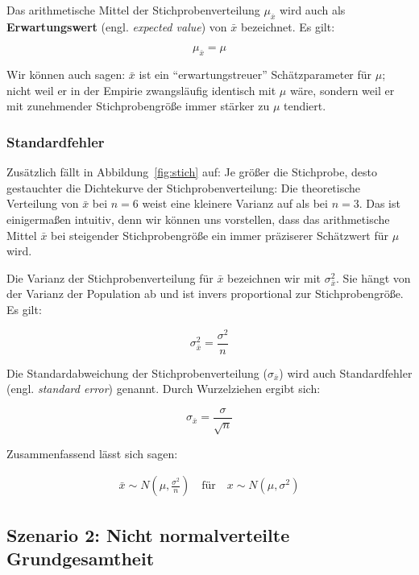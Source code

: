 \documentclass[
  11pt,
  ngerman,
  a4paper,
]{report}
\begin{document}
Das arithmetische Mittel der Stichprobenverteilung \(\mu_{\bar{x}}\) wird auch als \textbf{Erwartungswert} (engl. \emph{expected value}) von \(\bar{x}\) bezeichnet. Es gilt:

\nopagebreak

\[
\mu_{\bar{x}} = \mu
\label{eq:mean}
\]

Wir können auch sagen: \(\bar{x}\) ist ein \enquote{erwartungstreuer} Schätzparameter für \(\mu\); nicht weil er in der Empirie zwangsläufig identisch mit \(\mu\) wäre, sondern weil er mit zunehmender Stichprobengröße immer stärker zu \(\mu\) tendiert.

\hypertarget{standardfehler}{%
\subsubsection{Standardfehler}\label{standardfehler}}

Zusätzlich fällt in Abbildung~\ref{fig:stich} auf: Je größer die Stichprobe, desto gestauchter die Dichtekurve der Stichprobenverteilung: Die theoretische Verteilung von \(\bar{x}\) bei \(n=6\) weist eine kleinere Varianz auf als bei \(n=3\). Das ist einigermaßen intuitiv, denn wir können uns vorstellen, dass das arithmetische Mittel \(\bar{x}\) bei steigender Stichprobengröße ein immer präziserer Schätzwert für \(\mu\) wird.

Die Varianz der Stichprobenverteilung für \(\bar{x}\) bezeichnen wir mit \(\sigma^2_{\bar{x}}\). Sie hängt von der Varianz der Population ab und ist invers proportional zur Stichprobengröße. Es gilt:

\nopagebreak

\[
\sigma^2_{\bar{x}} = \frac{\sigma^2}{n}
\label{eq:4var}
\]

Die Standardabweichung der Stichprobenverteilung (\(\sigma_{\bar{x}}\)) wird auch Standardfehler (engl. \emph{standard error}) genannt. Durch Wurzelziehen ergibt sich:

\nopagebreak

\[
\sigma_{\bar{x}} = \frac{\sigma}{\sqrt{n}} \label{eq:4sd}
\]

Zusammenfassend lässt sich sagen:

\nopagebreak

\[
\begin{aligned}
\bar{x} \sim N(\mu, {\textstyle \frac{\sigma^2}{n}}) \quad \textrm{für} \quad x\sim N(\mu, \sigma^2)
\end{aligned}
\label{eq:4norm}
\]

\hypertarget{szenario-2-nicht-normalverteilte-grundgesamtheit}{%
\subsection{Szenario 2: Nicht normalverteilte Grundgesamtheit}\label{szenario-2-nicht-normalverteilte-grundgesamtheit}}
\end{document}
